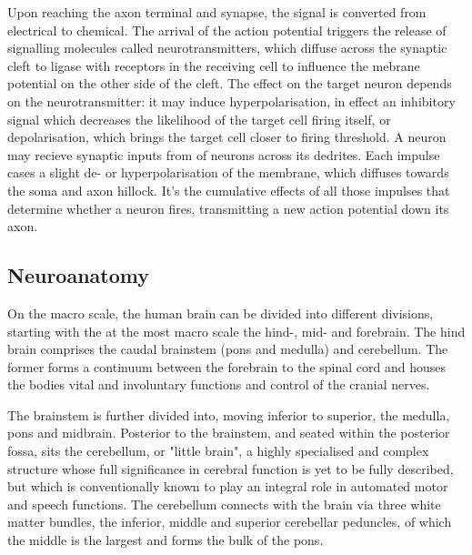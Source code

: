 Upon reaching the axon terminal and synapse, the signal is converted from electrical to chemical.
The arrival of the action potential triggers the release of signalling molecules called neurotransmitters, which diffuse across the synaptic cleft to ligase with receptors in the receiving cell to influence the mebrane potential on the other side of the cleft.
The effect on the target neuron depends on the neurotransmitter: it may induce hyperpolarisation, in effect an inhibitory signal which decreases the likelihood of the target cell firing itself, or depolarisation, which brings the target cell closer to firing threshold.
A neuron may recieve synaptic inputs from  of neurons across its dedrites.
Each impulse cases a slight de- or hyperpolarisation of the membrane, which diffuses towards the soma and axon hillock.
It's the cumulative effects of all those impulses that determine whether a neuron fires, transmitting a new action potential down its axon.


\subsection{Neuroanatomy}


On the macro scale, the human brain can be divided into  different divisions, starting with the at the most macro scale the hind-, mid- and forebrain.
The hind brain comprises the caudal brainstem (pons and medulla) and cerebellum.
The former forms a continuum between the forebrain to the spinal cord and houses the bodies vital and involuntary functions and control of the cranial nerves.

The brainstem is further divided into, moving inferior to superior, the medulla, pons and midbrain.
Posterior to the brainstem, and seated within the posterior fossa, sits the cerebellum, or "little brain",
a highly specialised and complex structure whose full significance in cerebral function is yet to be fully described, but which is conventionally known to play an integral role in automated motor and speech functions.
The cerebellum connects with the brain via three white matter bundles, the inferior, middle and superior cerebellar peduncles, of which the middle is the largest and forms the bulk of the pons. 

